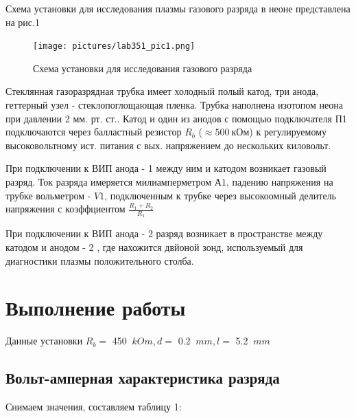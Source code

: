 \documentclass[a4paper, 14pt]{extarticle}%
\newcommand\ECaption[1]{%
     \captionsetup{font=footnotesize}%
     \caption{#1}}
\newcommand\ECaption[1]{%
     \captionsetup{font=footnotesize}%
     \caption{#1}}
\begin{document}
Схема установки для исследования плазмы газового разряда в неоне представлена на рис.1

\begin{figure}[h!]
\begin{center}
\texttt{[image: pictures/lab351\_pic1.png]}
\end{center}
\ECaption{Схема  установки для исследования газового разряда}
\end{figure}

Стеклянная газоразрядная трубка имеет холодный полый катод, три анода, геттерный узел - стеклопоглощающая пленка. Трубка наполнена изотопом неона при давлении 2 мм. рт. ст.. Катод и один из анодов с помощью подключателя П1 подключаются через балластный резистор $R_b$ ($\approx 500 \: \text{кОм}$) к регулируемому высоковольтному ист. питания с вых. напряжением до нескольких киловольт.

При подключении к ВИП анода - 1 между ним и катодом возникает газовый разряд. Ток разряда имеряется милиамперметром $А1$, падению напряжения на трубке вольметром - $V1$, подключенным к трубке через высокоомный делитель напряжения с коэффциентом $\frac{R_1 + R_2}{R_1}$

При подключении к ВИП анода - 2 разряд возникает в пространстве между катодом и анодом - 2 , где нахожится двйоной зонд, используемый для диагностики плазмы положительного столба. 




\section{Выполнение работы}

Данные установки $R_b = $ 450 $\: kOm, d = $ 0.2 $\: mm, l =$  5.2 $\: mm$

 \subsection{Вольт-амперная характеристика разряда}

Снимаем значения, составляем таблицу 1:
                
\end{document}
